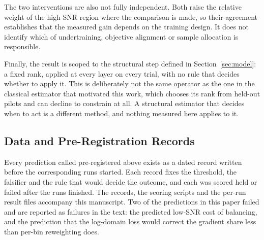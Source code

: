 \documentclass[journal]{IEEEtran}
\begin{document}
The two interventions are also not fully independent. Both raise the relative
weight of the high-SNR region where the comparison is made, so their agreement
establishes that the measured gain depends on the training design. It does not
identify which of undertraining, objective alignment or sample allocation is
responsible.

Finally, the result is scoped to the structural step defined in
Section~\ref{sec:model}: a fixed rank, applied at every layer on every trial,
with no rule that decides whether to apply it. This is deliberately not the
same operator as the one in the classical estimator that motivated this work,
which chooses its rank from held-out pilots and can decline to constrain at
all. A structural estimator that decides when to act is a different method, and
nothing measured here applies to it.

\subsection*{Data and Pre-Registration Records}

Every prediction called pre-registered above exists as a dated record written
before the corresponding runs started. Each record fixes the threshold, the
falsifier and the rule that would decide the outcome, and each was scored held
or failed after the runs finished. The records, the scoring scripts and the
per-run result files accompany this manuscript. Two of the predictions in this
paper failed and are reported as failures in the text: the predicted low-SNR
cost of balancing, and the prediction that the log-domain loss would correct
the gradient share less than per-bin reweighting does.
\end{document}
